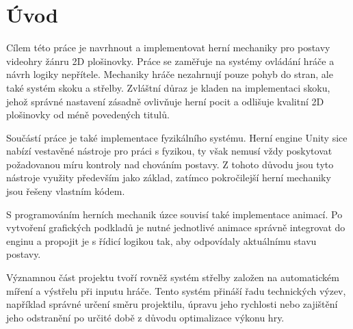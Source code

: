 \chapter{Úvod}
Cílem této práce je navrhnout a implementovat herní mechaniky pro postavy videohry žánru 2D plošinovky. Práce se zaměřuje na systémy ovládání hráče a návrh logiky nepřítele. Mechaniky hráče nezahrnují pouze pohyb do stran, ale také systém skoku a střelby. Zvláštní důraz je kladen na implementaci skoku, jehož správné nastavení zásadně ovlivňuje herní pocit a odlišuje kvalitní 2D plošinovky od méně povedených titulů.

Součástí práce je také implementace fyzikálního systému. Herní engine Unity sice nabízí vestavěné nástroje pro práci s fyzikou, ty však nemusí vždy poskytovat požadovanou míru kontroly nad chováním postavy. Z tohoto důvodu jsou tyto nástroje využity především jako základ, zatímco pokročilejší herní mechaniky jsou řešeny vlastním kódem.

S programováním herních mechanik úzce souvisí také implementace animací. Po vytvoření grafických podkladů je nutné jednotlivé animace správně integrovat do enginu a propojit je s řídicí logikou tak, aby odpovídaly aktuálnímu stavu postavy.

Významnou část projektu tvoří rovněž systém střelby založen na automatickém míření a výstřelu při inputu hráče. Tento systém přináší řadu technických výzev, například správné určení směru projektilu, úpravu jeho rychlosti nebo zajištění jeho odstranění po určité době z důvodu optimalizace výkonu hry.
